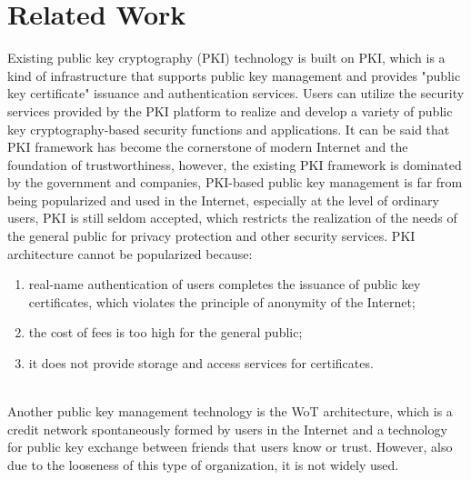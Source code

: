 \section{Related Work}
Existing public key cryptography (PKI) technology is built on PKI, which is a kind of 
infrastructure that supports public key management and provides "public key certificate" 
issuance and authentication services\cite{b5}. Users can utilize the security services provided 
by the PKI platform to realize and develop a variety of public key cryptography-based 
security functions and applications\cite{b6}. It can be said that PKI framework has become the 
cornerstone of modern Internet and the foundation of trustworthiness, however, the 
existing PKI framework is dominated by the government and companies, PKI-based public 
key management is far from being popularized and used in the Internet, especially at 
the level of ordinary users, PKI is still seldom accepted, which restricts the realization 
of the needs of the general public for privacy protection and other security services\cite{b4}. 
PKI architecture cannot be popularized because\cite{b2}: 
\begin{enumerate}[]
    \item real-name authentication of users completes the issuance of public key certificates, which violates the principle of anonymity of the Internet; 
    \item the cost of fees is too high for the general public;
    \item it does not provide storage and access services for certificates.
    \end{enumerate}
\\
Another public key management technology is the WoT architecture, which is a credit 
network spontaneously formed by users in the Internet and a technology for public key 
exchange between friends that users know or trust\cite{b4}. However, also due to the looseness 
of this type of organization, it is not widely used\cite{b3}.




